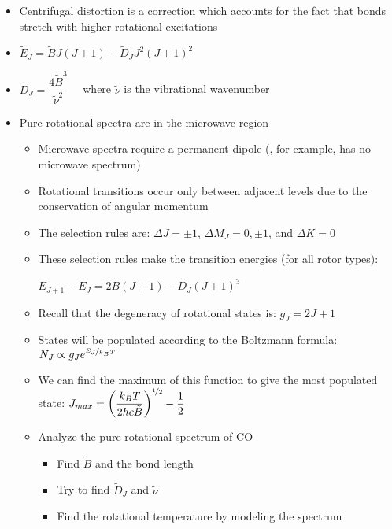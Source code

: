 \documentclass[12pt, openany, letterpaper]{memoir}
\begin{document}
\begin{itemize}
\begin{itemize}
	\end{itemize}
	\item Centrifugal distortion is a correction which accounts for the fact that bonds stretch with higher rotational excitations
	\item $\tilde{E}_J = \tilde{B}J(J+1)-\tilde{D}_J J^2(J+1)^2$ 
	\item $\tilde{D}_J = \dfrac{4\tilde{B}^3}{\tilde{\nu}^2}$ ~~where $\tilde{\nu}$ is the vibrational wavenumber
	\item Pure rotational spectra are in the microwave region
	\begin{itemize}
		\item Microwave spectra require a permanent dipole (, for example, has no microwave spectrum)
		\item Rotational transitions occur only between adjacent levels due to the conservation of angular momentum
		\item The selection rules are: $\Delta J=\pm 1$, $\Delta M_J=0,\pm1$, and $\Delta K=0$
		\item These selection rules make the transition energies (for all rotor types): 
		
		$E_{J+1}-E_J = 2\tilde{B}(J+1) - \tilde{D}_J(J+1)^3$
		\item Recall that the degeneracy of rotational states is: $g_J=2J+1$		
		\item States will be populated according to the Boltzmann formula: $N_J\propto g_Je^{\nicefrac{E_J}{k_BT}}$
		\item We can find the maximum of this function to give the most populated state: $J_{max}=\left(\dfrac{k_BT}{2hc\tilde{B}}\right)^{\nicefrac{1}{2}}-\dfrac{1}{2}$
		\item Analyze the pure rotational spectrum of CO
		\begin{itemize}
			\item Find $\tilde{B}$ and the bond length
			\item Try to find $\tilde{D}_J$ and $\tilde{\nu}$
			\item Find the rotational temperature by modeling the spectrum
		\end{itemize}
	\end{itemize}
\end{itemize}
\end{document}
